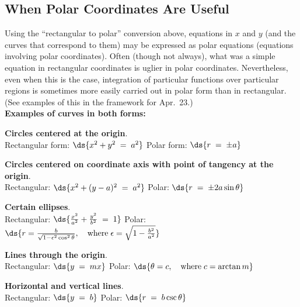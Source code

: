 \documentclass[12pt,fleqn]{article}
\def\egsc#1{{\bf Examples #1:}}
\begin{document}
\subsection*{When Polar Coordinates Are Useful}
Using the ``rectangular to polar'' conversion above, equations
in $x$ and $y$ (and the curves that correspond to them) may be
expressed as polar equations (equations involving polar coordinates).
Often (though not always), what was a simple equation in rectangular
coordinates is uglier in polar coordinates.  Nevertheless, even
when this is the case, integration of particular functions over
particular regions is sometimes more easily carried out in polar
form than in rectangular.  (See examples of this in the framework
for Apr.~23.) \\[10pt]
\egsc{of curves in both forms}
\be
\item {\bf Circles centered at the origin}.\\[8pt]
  \mbox{}\hspace{0.1in}
  Rectangular form:
  $\ds{ x^2 + y^2 \;=\; a^2}$
  \hspace{0.5in}
  Polar form:
  $\ds{ r \;=\; \pm a}$

\item
  {\bf Circles centered on coordinate axis with point
  of tangency at the origin}.\\[8pt]
  \mbox{}\hspace{0.1in}
  Rectangular:
  $\ds{ x^2 + (y-a)^2 \;=\; a^2 }$
  \hspace{0.5in}
  Polar:
  $\ds{ r \;=\; \pm 2a\sin\theta}$

\item {\bf Certain ellipses}.\\[8pt]
  \mbox{}\hspace{0.1in}
  Rectangular:
  $\ds{ \frac{x^2}{a^2} + \frac{y^2}{b^2} \;=\; 1 }$
  \hspace{0.5in}
  Polar:
  $\ds{ r = \frac{b}{\sqrt{1 - \epsilon^2 \cos^2\theta}}, \quad\mbox{where}\;
	\epsilon = \sqrt{1 - \frac{b^2}{a^2}} }$

\item {\bf Lines through the origin}.\\[8pt]
  \mbox{}\hspace{0.1in}
  Rectangular:
  $\ds{ y \;=\; mx }$
  \hspace{0.5in}
  Polar:
  $\ds{ \theta = c, \quad\mbox{where} \; c = \arctan m }$

\item {\bf Horizontal and vertical lines}.\\[8pt]
  \mbox{}\hspace{0.1in}
  Rectangular:
  $\ds{ y \;=\; b }$
  \hspace{0.5in}
  Polar:
  $\ds{ r \;=\; b\csc\theta }$
\ee
\end{document}

